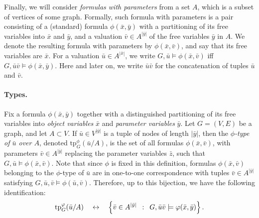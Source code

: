 Finally, we will consider \emph{formulas with parameters}
from a set $A$, which is a subset of vertices of some graph.
Formally, such formula with parameters is a pair consisting of a (standard) formula $\phi(\bar x,\bar y)$
with a partitioning of its free variables into $\bar x$ and $\bar y$,
and a valuation $\bar v\in A^{|\bar y|}$ of the free variables $\bar y$ in $A$.
We denote the resulting formula with parameters by $\phi(\bar x,\bar v)$, and say that its free variables 
are $\bar x$. For a valuation $\bar u\in A^{|\bar x|}$,
we write $G,\bar u\models \phi(\bar x,\bar v)$
iff $G,\bar u\bar v\models \phi(\bar x,\bar y)$. Here and later on, we write $\bar u\bar v$ for the concatenation of tuples $\bar u$ and $\bar v$.

\newcommand{\tp}{\mathrm{tp}}

\paragraph{Types.}
Fix a formula $\phi(\bar x,\bar y)$ together with a distinguished partitioning of its free variables into 
\emph{object variables} $\bar x$ and \emph{parameter variables} $\bar y$. 
Let $G=(V,E)$ be a graph, and let $A\subset V$.
If $\bar u\in V^{|\bar y|}$ is a tuple of 
nodes of length $|\bar y|$, then the 
\emph{$\phi$-type of $\bar u$ over $A$},
denoted $\tp^\phi_G(\bar u/A)$,
is the set of all
formulas $\phi(\bar x,\bar v)$,
with parameters $\bar v\in A^{|\bar y|}$
replacing the parameter variables $\bar z$,
such that $G,\bar u\models \phi(\bar x,\bar v)$.
Note that since $\phi$ is fixed in this definition, formulas $\phi(\bar x,\bar v)$ belonging to the $\phi$-type of $\bar u$ are in one-to-one correspondence
with tuples $\bar v\in A^{|\bar y|}$ satisfying $G,\bar u,\bar v\models \phi(\bar u,\bar v)$.
Therefore, up to this bijection, we have the following identification:
\begin{equation}\label{eq:bijection}
\tp^\phi_G(\bar u/A)\quad\leftrightarrow\quad\setof{\bar v\in  A^{|\bar y|}}{G, \bar u\bar v\models \phi(\bar x,\bar y)}.
\end{equation}

